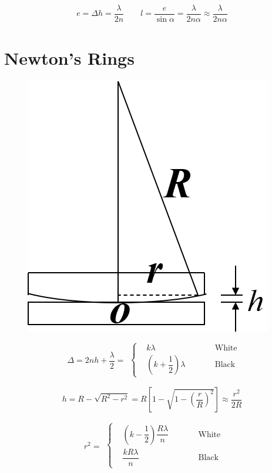 \begin{equation*}
  \begin{aligned}
    e = \Delta h = \dfrac{\lambda}{2 n} \quad\quad l = \dfrac{e}{\sin \alpha} = \dfrac{\lambda}{2 n \alpha} \approx \dfrac{\lambda}{2 n \alpha}   
  \end{aligned}
\end{equation*}

\section{Newton's Rings}

\begin{figure}[H]
  \centering
  \includegraphics[width=0.4\linewidth]{figures/Newton-Ring}
\end{figure}

\begin{equation*}
  \begin{aligned}
    \Delta = 2 n h + \dfrac{\lambda}{2} = 
  \end{aligned}
  \left\{
    \begin{aligned}
      & k \lambda && \quad\quad \text{White} \\
      & \left( k + \dfrac{1}{2}  \right) \lambda && \quad\quad \text{Black}
    \end{aligned}
  \right.
\end{equation*}

\begin{equation*}
  \begin{aligned}
    h = R - \sqrt{R^2 - r^2} = R \left[ 1 - \sqrt{1 - \left( \dfrac{r}{R}  \right)^2 } \right] \approx \dfrac{r^2}{2R} 
  \end{aligned}
\end{equation*}

\begin{equation*}
  \begin{aligned}
    r^2 = 
  \end{aligned}
  \left\{
    \begin{aligned}
      & \left( k - \dfrac{1}{2}  \right) \dfrac{R \lambda}{n} && \quad\quad \text{White} \\
      & \dfrac{k R \lambda}{n} && \quad\quad \text{Black} 
    \end{aligned}
  \right.
\end{equation*}

